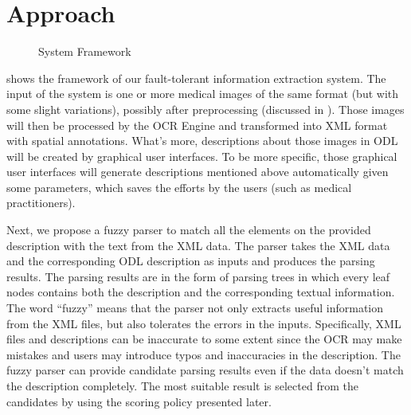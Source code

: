 \section{Approach}
\label{sec:appro}
%

\begin{figure}[ht]
\centering
{}
\caption{System Framework}
\label{fig:frame}
\end{figure}

 shows the framework of our fault-tolerant
information extraction system. The input of the system is
one or more medical images of the same format (but 
with some slight variations), possibly after preprocessing (discussed in
). Those images will then be processed by the OCR Engine 
and transformed into XML format with spatial annotations. 
What's more, descriptions about those images in ODL will be created 
by graphical user interfaces. To be more specific, those 
graphical user interfaces will  generate descriptions mentioned above 
automatically given some parameters, which saves the efforts by the users 
(such as medical practitioners).

 
Next, we propose a fuzzy parser to match all the elements on 
the provided description with the text from the XML data. The 
parser takes the XML data and the corresponding ODL description as inputs 
and produces the parsing results. The parsing results are in the form of 
parsing trees in which every leaf nodes contains both the description and 
the corresponding textual information.
The word ``fuzzy'' means that the parser not only 
extracts useful information from the XML files, but also tolerates the 
errors in the inputs. Specifically, XML files 
and descriptions can be inaccurate to some extent since the OCR may make
mistakes and users may introduce typos and inaccuracies in the description. 
The fuzzy parser can provide candidate parsing results even if the data doesn't
match the description completely. The most suitable result is selected 
from the candidates by using the scoring policy presented later.    

